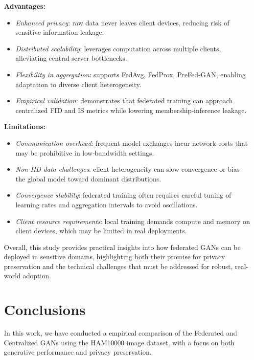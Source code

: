 \documentclass{article}
\begin{document}
\medskip

\noindent\textbf{Advantages:}
\begin{itemize}
  \item \emph{Enhanced privacy}: raw data never leaves client devices, reducing risk of sensitive information leakage.
  \item \emph{Distributed scalability}: leverages computation across multiple clients, alleviating central server bottlenecks.
  \item \emph{Flexibility in aggregation}: supports FedAvg, FedProx, PreFed‑GAN, enabling adaptation to diverse client heterogeneity.
  \item \emph{Empirical validation}: demonstrates that federated training can approach centralized FID and IS metrics while lowering membership‑inference leakage.
\end{itemize}

\medskip

\noindent\textbf{Limitations:}
\begin{itemize}
  \item \emph{Communication overhead}: frequent model exchanges incur network costs that may be prohibitive in low‑bandwidth settings.
  \item \emph{Non‑IID data challenges}: client heterogeneity can slow convergence or bias the global model toward dominant distributions.
  \item \emph{Convergence stability}: federated training often requires careful tuning of learning rates and aggregation intervals to avoid oscillations.
  \item \emph{Client resource requirements}: local training demands compute and memory on client devices, which may be limited in real deployments.
\end{itemize}

\medskip

\noindent Overall, this study provides practical insights into how federated GANs can be deployed in sensitive domains, highlighting both their promise for privacy preservation and the technical challenges that must be addressed for robust, real-world adoption.



\section{Conclusions}
In this work, we have conducted a empirical comparison of the Federated and Centralized GANs using the HAM10000 image dataset, with a focus on both generative performance and privacy preservation. 
\end{document}
